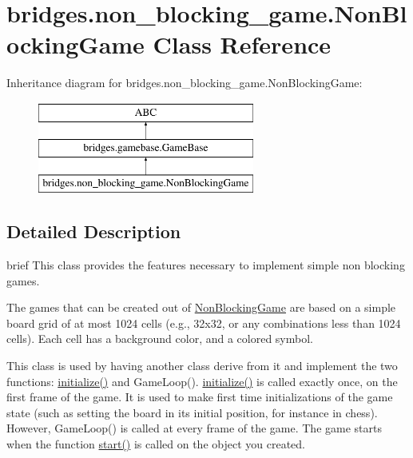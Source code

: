 \hypertarget{classbridges_1_1non__blocking__game_1_1_non_blocking_game}{}\section{bridges.\+non\+\_\+blocking\+\_\+game.\+Non\+Blocking\+Game Class Reference}
\label{classbridges_1_1non__blocking__game_1_1_non_blocking_game}
Inheritance diagram for bridges.\+non\+\_\+blocking\+\_\+game.\+Non\+Blocking\+Game\+:\begin{figure}[H]
\begin{center}
\leavevmode
\includegraphics[height=3.000000cm]{classbridges_1_1non__blocking__game_1_1_non_blocking_game}
\end{center}
\end{figure}


\subsection{Detailed Description}
brief This class provides the features necessary to implement simple non blocking games. 

The games that can be created out of \hyperlink{classbridges_1_1non__blocking__game_1_1_non_blocking_game}{Non\+Blocking\+Game} are based on a simple board grid of at most 1024 cells (e.\+g., 32x32, or any combinations less than 1024 cells). Each cell has a background color, and a colored symbol.

This class is used by having another class derive from it and implement the two functions\+: \hyperlink{classbridges_1_1gamebase_1_1_game_base_a336629d190f1601f1211ca57e4d5427d}{initialize()} and Game\+Loop(). \hyperlink{classbridges_1_1gamebase_1_1_game_base_a336629d190f1601f1211ca57e4d5427d}{initialize()} is called exactly once, on the first frame of the game. It is used to make first time initializations of the game state (such as setting the board in its initial position, for instance in chess). However, Game\+Loop() is called at every frame of the game. The game starts when the function \hyperlink{classbridges_1_1non__blocking__game_1_1_non_blocking_game_ad6e23c265e1b710114459f0b666d25cb}{start()} is called on the object you created.

